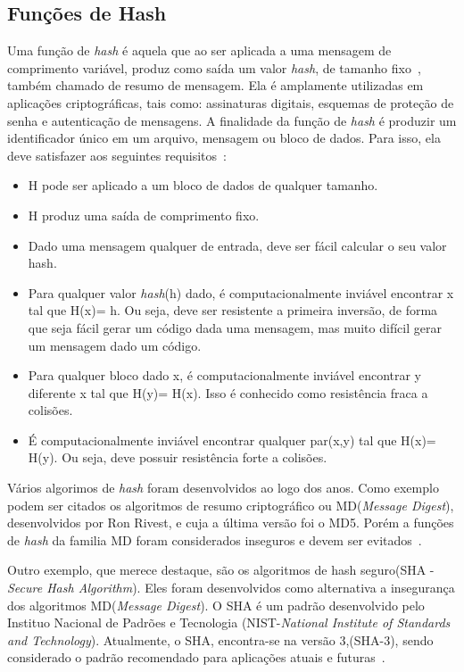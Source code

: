 \subsection{Funções de Hash}
Uma função de \emph{hash} é aquela que ao ser aplicada a uma mensagem de comprimento variável, produz como saída um valor \emph{hash}, de tamanho fixo~\cite{Schneier1995}, também chamado de resumo de mensagem. Ela é amplamente utilizadas em aplicações criptográficas, tais como: assinaturas digitais, esquemas de proteção de senha e autenticação de mensagens. A finalidade da função de \emph{hash} é produzir um identificador único em um arquivo, mensagem ou bloco de dados. Para isso, ela deve satisfazer aos seguintes requisitos~\cite{stallings2008}:
\begin{itemize}
\item H pode ser aplicado a um bloco de dados de qualquer tamanho.
\item H produz uma saída de comprimento fixo.
\item Dado uma mensagem qualquer de entrada, deve ser fácil calcular o seu valor hash.
\item Para qualquer valor \emph{hash}(h) dado, é computacionalmente inviável encontrar x tal que H(x)= h. Ou seja,  deve ser resistente a primeira inversão, de forma que seja fácil gerar um código dada uma mensagem, mas muito difícil gerar um mensagem dado um código.
\item Para qualquer bloco dado x, é computacionalmente inviável encontrar y diferente x tal que H(y)= H(x). Isso é conhecido como resistência fraca a colisões.

\item É computacionalmente inviável encontrar qualquer par(x,y) tal que H(x)= H(y). Ou seja, deve possuir resistência forte a colisões.

\end{itemize}

Vários algorimos de \emph{hash} foram desenvolvidos ao logo dos anos. Como exemplo podem ser citados os algoritmos de resumo criptográfico ou MD(\emph{Message Digest}), desenvolvidos por Ron Rivest, e cuja a última versão foi o MD5. Porém a funções de \emph{hash} da familia MD foram considerados inseguros e devem ser evitados~\cite{forouzan2013redes}.

Outro exemplo, que merece destaque, são os algoritmos de hash seguro(SHA - \emph{Secure Hash Algorithm}). Eles foram desenvolvidos como alternativa a insegurança dos algoritmos MD(\emph{Message Digest}). O SHA é um padrão desenvolvido pelo Instituo Nacional de Padrões e Tecnologia (NIST-\emph{National Institute of Standards and Technology}). Atualmente, o SHA, encontra-se na versão 3,(SHA-3), sendo considerado o padrão recomendado para aplicações atuais e futuras~\cite{forouzan2013redes}.

